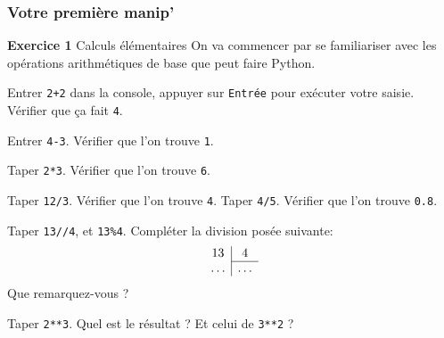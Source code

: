 \documentclass[10pt]{beamer}
\begin{document}
\begin{frame}[fragile]
	\frametitle{Votre première manip'}
	\begin{block}{\textbf{Exercice 1} Calculs élémentaires}
		On va commencer par se familiariser avec les opérations arithmétiques de base que peut faire Python.
		
		\begin{description}[<+->]
		\item[Addition] Entrer \verb|2+2| dans la console, appuyer sur \verb|Entrée| pour exécuter votre saisie. Vérifier que ça fait \verb|4|.
		\item[Soustraction] Entrer \verb|4-3|. Vérifier que l'on trouve \verb|1|.
		\item[Produit] Taper \verb|2*3|. Vérifier que l'on trouve \verb|6|.
		\item[Division] Taper \verb|12/3|. Vérifier que l'on trouve \verb|4|. Taper \verb|4/5|. Vérifier que l'on trouve \verb|0.8|.
		\item[...de CM1] Taper \verb|13//4|, et \verb|13%4|. Compléter la division posée suivante:
			\[
			\begin{array}{c|c}
			13      & 4\\ \cline{2-2}
			\ldots  & \ldots
			\end{array}
			 \]
			Que remarquez-vous ?
		\item[Puissances] Taper \verb|2**3|. Quel est le résultat ? Et celui de \verb|3**2| ?
		\end{description}
	\end{block}
\end{frame}
\end{document}
